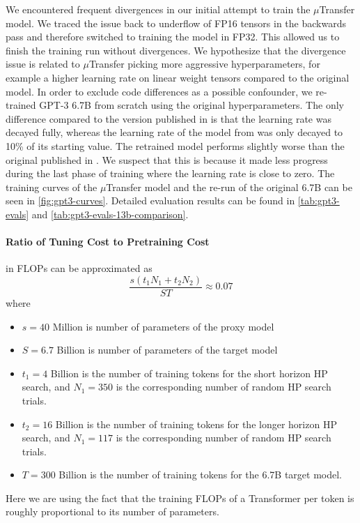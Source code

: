 \documentclass{article}
\theoremstyle{definition}
\begin{document}
We encountered frequent divergences in our initial attempt to train the $\mu$Transfer model.
We traced the issue back to underflow of FP16 tensors in the backwards pass and therefore switched to training the model in FP32.
This allowed us to finish the training run without divergences.
We hypothesize that the divergence issue is related to $\mu$Transfer picking more aggressive hyperparameters, for example a higher learning rate on linear weight tensors compared to the original model.
In order to exclude code differences as a possible confounder, we re-trained GPT-3 6.7B from scratch using the original hyperparameters.
The only difference compared to the version published in \cite{brown2020language} is that the learning rate was decayed fully, whereas the learning rate of the model from \cite{brown2020language} was only decayed to 10\% of its starting value.
The retrained model performs slightly worse than the original published in \cite{brown2020language}.
We suspect that this is because it made less progress during the last phase of training where the learning rate is close to zero.
The training curves of the $\mu$Transfer model and the re-run of the original 6.7B can be seen in \cref{fig:gpt3-curves}.
Detailed evaluation results can be found in \cref{tab:gpt3-evals} and \cref{tab:gpt3-evals-13b-comparison}.

\paragraph{Ratio of Tuning Cost to Pretraining Cost}
in FLOPs can be approximated as
\[
  \frac
  {s (t_1 N_1 + t_2 N_2)}
  {S T} \approx 0.07\]
where
\begin{itemize}
  \item $s = 40$ Million is number of parameters of the proxy model
  \item $S = 6.7$ Billion is number of parameters of the target model
  \item $t_1= 4$ Billion is the number of training tokens for the short horizon HP search, and $N_1 = 350$ is the corresponding number of random HP search trials.
  \item $t_2= 16$ Billion is the number of training tokens for the longer horizon HP search, and $N_1 = 117$ is the corresponding number of random HP search trials.
  \item $T = 300$ Billion is the number of training tokens for the 6.7B target model.
\end{itemize}
Here we are using the fact that the training FLOPs of a Transformer per token is roughly proportional to its number of parameters.
\end{document}
